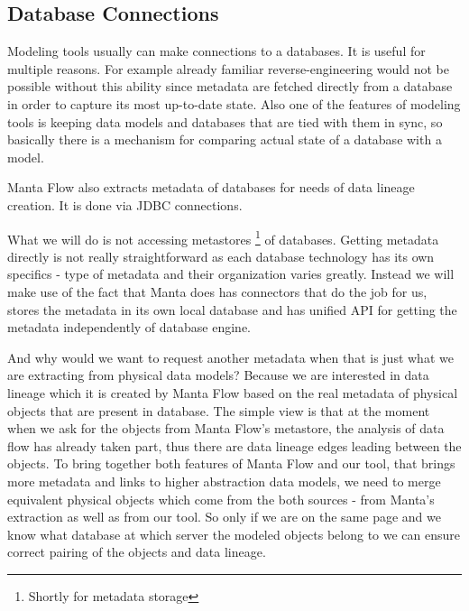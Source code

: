 \subsection{Database Connections}

Modeling tools usually can make connections to a databases. It is useful for multiple reasons. For example already familiar reverse-engineering would not be possible without this ability since metadata are fetched directly from a database in order to capture its most up-to-date state. Also one of the features of modeling tools is keeping data models and databases that are tied with them in sync, so basically there is a mechanism for comparing actual state of a database with a model. 

Manta Flow also extracts metadata of databases for needs of data lineage creation. It is done via JDBC connections.

What we will do is not accessing metastores \footnote{Shortly for metadata storage} of databases. Getting metadata directly is not really straightforward as each database technology has its own specifics - type of metadata and their organization varies greatly. Instead we will make use of the fact that Manta does has connectors that do the job for us, stores the metadata in its own local database and has unified API for getting the metadata independently of database engine. 

And why would we want to request another metadata when that is just what we are extracting from physical data models? \label{matching_physical_objects}
Because we are interested in data lineage which it is created by Manta Flow based on the real metadata of physical objects that are present in database.
The simple view is that at the moment when we ask for the objects from Manta Flow's metastore, the analysis of data flow has already taken part, thus there are data lineage edges leading between the objects. To bring together both features of Manta Flow and our tool, that brings more metadata and links to higher abstraction data models, we need to merge equivalent physical objects which come from the both sources - from Manta's extraction as well as from our tool. 
So only if we are on the same page and we know what database at which server the modeled objects belong to we can ensure correct pairing of the objects and data lineage. \\

